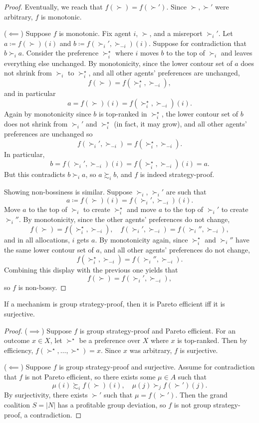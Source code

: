 \begin{proof}
	Eventually, we reach that $f(\succ) = f(\succ')	$. Since $\succ,\succ'$ were arbitrary, $f$ is monotonic.

	($\impliedby$)
	Suppose $f$ is monotonic.
	Fix agent $i$, $\succ$, and a misreport $\succ_i'$.
	Let $a\coloneqq  f(\succ)(i)$ and $b\coloneqq f(\succ_i',\succ_{-i})(i)$. Suppose for contradiction that $b \succ_i a$.
	Consider the preference $\succ_i^\star$ where $i$ moves $b$ to the top of $\succ_i$ and leaves everything else unchanged.
	By monotonicity, since the lower contour set of $a$ does not shrink from $\succ_i$ to $\succ_i^\star$, and all other agents' preferences are unchanged, \[
		f(\succ) = f(\succ_i^\star,\succ_{-i})
	,\] and in particular \[
		a = f(\succ)(i) = f(\succ_i^\star, \succ_{-i})(i)
	.\] 
	Again by monotonicity since $b$ is top-ranked in $\succ_i^\star$, the lower contour set of $b$ does not shrink from $\succ_i'$ and $\succ_i^\star$ (in fact, it may grow), and all other agents' preferences are unchanged so \[
		f(\succ_i',\succ_{-i}) = f(\succ_i^\star,\succ_{-i}) 
	.\] In particular, \[
		b = f(\succ_i',\succ_{-i})(i) = f(\succ_{i}^\star,\succ_{-i})(i) = a
	.\] But this contradicts $b \succ_i a$, so $a\succsim_i b$, and $f$ is indeed strategy-proof.

	Showing non-bossiness is similar. Suppose $\succ_i$, $\succ_i'$ are such that \[
		a\coloneqq f(\succ)(i) = f(\succ_i', \succ_{-i})(i)
	.\] Move $a$ to the top of $\succ_i$ to create $\succ_i^\star$ and move $a$ to the top of $\succ_i'$ to create $\succ_i''$.
	By monotonicity, since the other agents' preferences do not change, \[
		f(\succ) = f(\succ_i^\star,\succ_{-i}), \quad f(\succ_i',\succ_{-i}) = f(\succ_i'',\succ_{-i})
	,\] and in all allocations, $i$ gets $a$.
	By monotonicity again, since $\succ_i^\star$ and $\succ_i''$ have the same lower contour set of $a$, and all other agents' preferences do not change, \[
		f(\succ_i^\star,\succ_{-i}) = f(\succ_{i}'',\succ_{-i})
	.\] 
	Combining this display with the previous one yields that \[
		f(\succ) = f(\succ_i',\succ_{-i})
	,\] so $f$ is non-bossy.
\end{proof}

\begin{lemma}
	If a mechanism is group strategy-proof, then it is Pareto efficient iff it is surjective.
\end{lemma}
\begin{proof}
	($\implies$)
	Suppose $f$ is group strategy-proof and Pareto efficient.
	For an outcome $x \in X$, let $\succ^\star$ be a preference over $X$ where $x$ is top-ranked. Then by efficiency, $f(\succ^\star,\ldots,\succ^\star) = x$. Since $x$ was arbitrary, $f$ is surjective.

	($\impliedby$) Suppose $f$ is group strategy-proof and surjective.
	Assume for contradiction that $f$ is not Pareto efficient, so there exists some $\mu \in A$ such that \[
		\mu(i) \succsim_i f(\succ)(i), \quad \mu(j) \succ_j f(\succ')(j)
	.\] 
	By surjectivity, there exists $\succ'$ such that $\mu = f(\succ')$.
	Then the grand coalition $S = \left| N \right|$ has a profitable group deviation, so $f$ is not group strategy-proof, a contradiction.
\end{proof}

